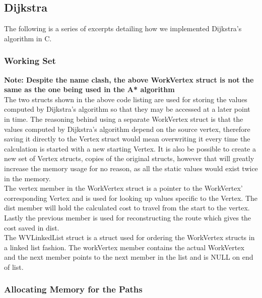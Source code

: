 \subsection{Dijkstra}

The following is a series of excerpts detailing how we implemented Dijkstra's algorithm in C.

\subsubsection{Working Set}



\textbf{Note: Despite the name clash, the above WorkVertex struct is not the same as the one being used in the A* algorithm}\\
The two structs shown in the above code listing are used for storing the values computed by Dijkstra's algorithm so that they may be accessed at a later point in time. The reasoning behind using a separate WorkVertex struct is that the values computed by Dijkstra's algorithm depend on the source vertex, therefore saving it directly to the Vertex struct would mean overwriting it every time the calculation is started with a new starting Vertex. It is also be possible to create a new set of Vertex structs, copies of the original structs, however that will greatly increase the memory usage for no reason, as all the static values would exist twice in the memory.\\
The vertex member in the WorkVertex struct is a pointer to the WorkVertex' corresponding Vertex and is used for looking up values specific to the Vertex. The dist member will hold the calculated cost to travel from the start to the vertex. Lastly the previous member is used for reconstructing the route which gives the cost saved in dist.\\
The WVLinkedList struct is a struct used for ordering the WorkVertex structs in a linked list fashion. The workVertex member contains the actual WorkVertex and the next member points to the next member in the list and is NULL on end of list.

\subsubsection{Allocating Memory for the Paths}



